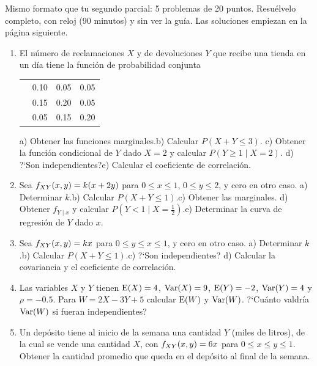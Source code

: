 Mismo formato que tu segundo parcial: 5 problemas de 20 puntos. Resu\'elvelo completo, con reloj (90 minutos) y sin ver la gu\'ia.
Las soluciones empiezan en la p\'agina siguiente.

\begin{enumerate}[label=\textbf{\arabic*.-},leftmargin=9mm,itemsep=10pt]
\item El n\'umero de reclamaciones $X$ y de devoluciones $Y$ que recibe una tienda en un d\'ia tiene la funci\'on de probabilidad conjunta
\begin{center}\small
\begin{tabular}{|C|C|C|C|}\hline
{} &  &  & \\\hline
{} & 0.10 & 0.05 & 0.05\\\hline
{} & 0.15 & 0.20 & 0.05\\\hline
{} & 0.05 & 0.15 & 0.20\\\hline
\end{tabular}
\end{center}
a) Obtener las funciones marginales.\quad b) Calcular $P(X+Y\le3)$.\quad
c) Obtener la funci\'on condicional de $Y$ dado $X=2$ y calcular $P(Y\ge1\mid X=2)$.\quad
d) ?`Son independientes?\quad e) Calcular el coeficiente de correlaci\'on.

\item Sea $f_{XY}(x,y)=k(x+2y)$ para $0\le x\le1$, $0\le y\le2$, y cero en otro caso.\quad
a) Determinar $k$.\quad b) Calcular $P(X+Y\le1)$.\quad c) Obtener las marginales.\quad
d) Obtener $f_{Y\mid x}$ y calcular $P(Y<1\mid X=\tfrac12)$.\quad e) Determinar la curva de regresi\'on de $Y$ dado $x$.

\item Sea $f_{XY}(x,y)=kx$ para $0\le y\le x\le1$, y cero en otro caso.\quad
a) Determinar $k$.\quad b) Calcular $P(X+Y\le1)$.\quad c) ?`Son independientes?\quad
d) Calcular la covariancia y el coeficiente de correlaci\'on.

\item Las variables $X$ y $Y$ tienen $\operatorname{E}(X)=4$, $\operatorname{Var}(X)=9$, $\operatorname{E}(Y)=-2$, $\operatorname{Var}(Y)=4$ y $\rho=-0.5$.
Para $W=2X-3Y+5$ calcular $\operatorname{E}(W)$ y $\operatorname{Var}(W)$. ?`Cu\'anto valdr\'ia $\operatorname{Var}(W)$ si fueran independientes?

\item Un dep\'osito tiene al inicio de la semana una cantidad $Y$ (miles de litros), de la cual se vende una cantidad $X$, con
$f_{XY}(x,y)=6x$ para $0\le x\le y\le1$. Obtener la cantidad promedio que queda en el dep\'osito al final de la semana.
\end{enumerate}


